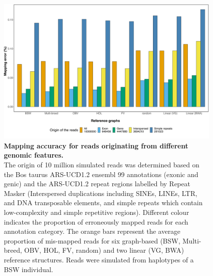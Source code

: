 \documentclass[../main.tex]{subfiles}
\begin{document}
\begin{flushleft}
\begin{figure}[!htb]
    \centering
    \includegraphics[width=\textwidth]{paper2/supplement/sp312.pdf}
    \caption[ Mapping accuracy from different genomic features.]{\textbf{Mapping accuracy for reads originating from different genomic
    features.} \\
    \small{The origin of 10 million simulated reads was determined based on the Bos taurus
    ARS-UCD1.2 ensembl 99 annotations (exonic and genic) and the ARS-UCD1.2
    repeat regions labelled by Repeat Masker (Interspersed duplications including
    SINEs, LINEs, LTR, and DNA transposable elements, and simple repeats which
    contain low-complexity and simple repetitive regions). Different colour indicates the
    proportion of erroneously mapped reads for each annotation category. The orange
    bars represent the average proportion of mis-mapped reads for six graph-based
    (BSW, Multi-breed, OBV, HOL, FV, random) and two linear (VG, BWA) reference
    structures. Reads were simulated from haplotypes of a BSW individual.}}
    \label{sup_fig:s312}
\end{figure}



\end{flushleft}
\end{document}
